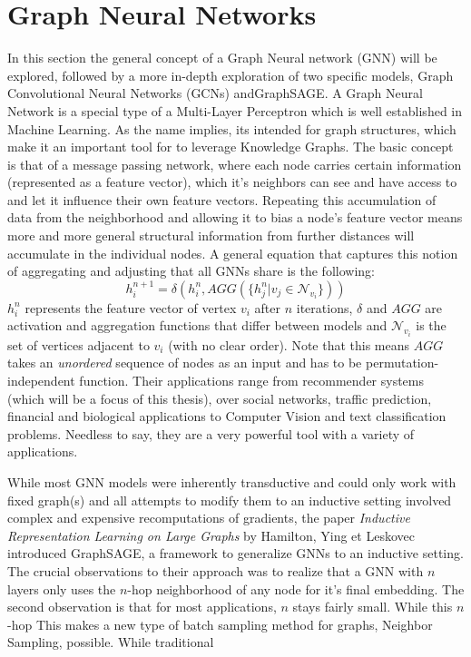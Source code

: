 \documentclass[draft,final]{vutinfth} %
\begin{document}
\section{Graph Neural Networks}
In this section the general concept of a Graph Neural network (GNN) will be explored, followed by a more in-depth exploration of two specific models, Graph Convolutional Neural Networks (GCNs) andGraphSAGE.
A Graph Neural Network is a special type of a Multi-Layer Perceptron which is well established in Machine Learning. As the name implies, its intended for graph structures, which make it an important tool for to leverage Knowledge Graphs. The basic concept is that of a message passing network, where each node carries certain information (represented as a feature vector), which it's neighbors can see and have access to and let it influence their own feature vectors. Repeating this accumulation of data from the neighborhood and allowing it to bias a node's feature vector means more and more general structural information from further distances will accumulate in the individual nodes. A general equation that captures this notion of aggregating and adjusting that all GNNs share is the following:
$$h^{n+1}_i = \delta(h^n_i,AGG(\{h^n_j | v_j \in \mathcal{N}_{v_i}\}))$$
$h^n_i$ represents the feature vector of vertex $v_i$ after $n$ iterations, $\delta$ and $AGG$ are activation and aggregation functions that differ between models and $\mathcal{N}_{v_i}$ is the set of vertices adjacent to $v_i$ (with no clear order). Note that this means $AGG$ takes an \textit{unordered} sequence of nodes as an input and has to be permutation-independent function. 
Their applications range from recommender systems (which will be a focus of this thesis), over social networks, traffic prediction, financial and biological applications to Computer Vision and text classification problems. Needless to say, they are a very powerful tool with a variety of applications. \cite{Explainable_GNNs}

While most GNN models were inherently transductive and could only work with fixed graph(s) and all attempts to modify them to an inductive setting involved complex and expensive recomputations of gradients, the paper \textit{Inductive Representation Learning on Large Graphs} by Hamilton, Ying et Leskovec introduced GraphSAGE, a framework to generalize GNNs to an inductive setting. The crucial observations to their approach was to realize that a GNN with $n$ layers only uses the $n$-hop neighborhood of any node for it's final embedding. The second observation is that for most applications, $n$ stays fairly small.  While this $n$-hop This makes a new type of batch sampling method for graphs, Neighbor Sampling, possible. While traditional 
\end{document}
